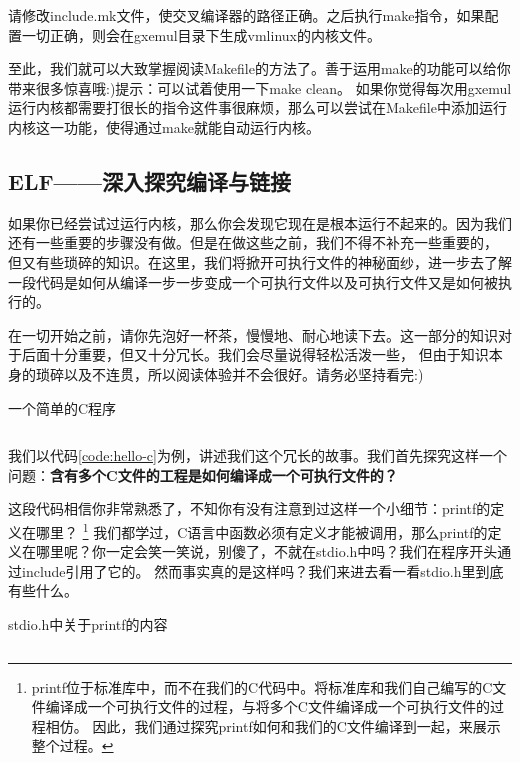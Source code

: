 \begin{exercise}
请修改include.mk文件，使交叉编译器的路径正确。之后执行make指令，如果配置一切正确，则会在gxemul目录下生成vmlinux的内核文件。
\end{exercise}

至此，我们就可以大致掌握阅读Makefile的方法了。善于运用make的功能可以给你带来很多惊喜哦:)提示：可以试着使用一下make clean。
如果你觉得每次用gxemul运行内核都需要打很长的指令这件事很麻烦，那么可以尝试在Makefile中添加运行内核这一功能，使得通过make就能自动运行内核。

\subsection{ELF——深入探究编译与链接}
如果你已经尝试过运行内核，那么你会发现它现在是根本运行不起来的。因为我们还有一些重要的步骤没有做。但是在做这些之前，我们不得不补充一些重要的，
但又有些琐碎的知识。在这里，我们将掀开可执行文件的神秘面纱，进一步去了解一段代码是如何从编译一步一步变成一个可执行文件以及可执行文件又是如何被执行的。

在一切开始之前，请你先泡好一杯茶，慢慢地、耐心地读下去。这一部分的知识对于后面十分重要，但又十分冗长。我们会尽量说得轻松活泼一些，
但由于知识本身的琐碎以及不连贯，所以阅读体验并不会很好。请务必坚持看完:)

\begin{codeBoxWithCaption}{一个简单的C程序\label{code:hello-c}}
  \inputminted[linenos]{c}{codes/hello.c}
\end{codeBoxWithCaption}

我们以代码\ref{code:hello-c}为例，讲述我们这个冗长的故事。我们首先探究这样一个问题：\textbf{含有多个C文件的工程是如何编译成一个可执行文件的？}

这段代码相信你非常熟悉了，不知你有没有注意到过这样一个小细节：printf的定义在哪里？
\footnote{printf位于标准库中，而不在我们的C代码中。将标准库和我们自己编写的C文件编译成一个可执行文件的过程，与将多个C文件编译成一个可执行文件的过程相仿。
因此，我们通过探究printf如何和我们的C文件编译到一起，来展示整个过程。}
我们都学过，C语言中函数必须有定义才能被调用，那么printf的定义在哪里呢？你一定会笑一笑说，别傻了，不就在stdio.h中吗？我们在程序开头通过include引用了它的。
然而事实真的是这样吗？我们来进去看一看stdio.h里到底有些什么。

\begin{codeBoxWithCaption}{stdio.h中关于printf的内容\label{code:part-stdio-h}}
  \inputminted[linenos]{c}{codes/part_of_stdio.h}
\end{codeBoxWithCaption}

